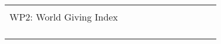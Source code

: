 \begin{longtable}[]{@{}lllllllllll@{}}
\begin{minipage}[t]{0.07\columnwidth}
\begin{quote}
\begin{minipage}[t]{0.07\columnwidth}\raggedright \strut \end{minipage} & \begin{minipage}[t]{0.07\columnwidth}\raggedright \strut \end{minipage}\tabularnewline \begin{minipage}[t]{0.07\columnwidth}\raggedright WP2: World Giving Index\strut \end{minipage} & \begin{minipage}[t]{0.07\columnwidth}\raggedright \strut \end{minipage} & \begin{minipage}[t]{0.07\columnwidth}\raggedright \strut \end{minipage} & \begin{minipage}[t]{0.07\columnwidth}\raggedright \strut \end{minipage} & \begin{minipage}[t]{0.07\columnwidth}\raggedright \strut \end{minipage} & \begin{minipage}[t]{0.07\columnwidth}\raggedright \strut \end{minipage} & \begin{minipage}[t]{0.07\columnwidth}\raggedright \strut \end{minipage} & \begin{minipage}[t]{0.07\columnwidth}\raggedright \strut \end{minipage} & \begin{minipage}[t]{0.07\columnwidth}\raggedright \strut \end{minipage} & \begin{minipage}[t]{0.07\columnwidth}\raggedright \strut \end{minipage} & \begin{minipage}[t]{0.07\columnwidth}\raggedright \strut \end{minipage}\tabularnewline \begin{minipage}[t]{0.07\columnwidth}\raggedright \begin{quote}

\end{quote}
\end{minipage}
\end{longtable}
